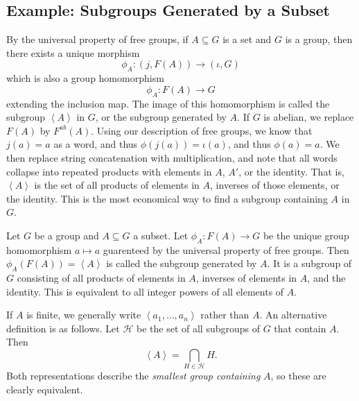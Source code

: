 \subsection{Example: Subgroups Generated by a Subset}
By the universal property of free groups, if $A\subseteq G$ is a set and $G$ is a group, then there exists a unique morphism
\[
	\phi_A : (j,F(A)) \to (\iota ,G)
\]
which is also a group homomorphism
\[
	\phi_A :F(A)\to G
\]
extending the inclusion map. The image of this homomorphism is called the subgroup $\left\langle A \right\rangle $ in $G$, or the subgroup generated by $A$. If $G$ is abelian, we replace $F(A)$ by $F^{ab}(A)$. Using our description of free groups, we know that $j(a)=a$ as a word, and thus $\phi (j(a))=\iota (a)$, and thus $\phi (a)=a$. We then replace string concatenation with multiplication, and note that all words collapse into repeated products with elements in $A$, $A'$, or the identity. That is, $\left\langle A \right\rangle $ is the set of all products of elements in $A$, inverses of those elements, or the identity. This is the most economical way to find a subgroup containing $A$ in  $G$.
\begin{definition}\label{dfn:2.6.3}
	Let $G$ be a group and $A\subseteq G$ a subset. Let $\phi_A : F(A) \to G$ be the unique group homomorphism $a\mapsto a$ guarenteed by the universal property of free groups. Then $\phi_A(F(A))=\left\langle A \right\rangle $ is called the subgroup generated by $A$. It is a subgroup of $G$ consisting of all products of elements in $A$, inverses of elements in $A$, and the identity. This is equivalent to all integer powers of all elements of $A$.
\end{definition}

If $A$ is finite, we generally write $\left\langle a_1, \dots, a_n  \right\rangle $ rather than $A$. An alternative definition is as follows. Let $\mathcal{H} $ be the set of all subgroups of $G$ that contain $A$. Then
\[
	\left\langle A \right\rangle =\bigcap_{H\in \mathcal{H} } H
.\]
Both representations describe the \emph{smallest group containing} $A$, so these are clearly equivalent.

